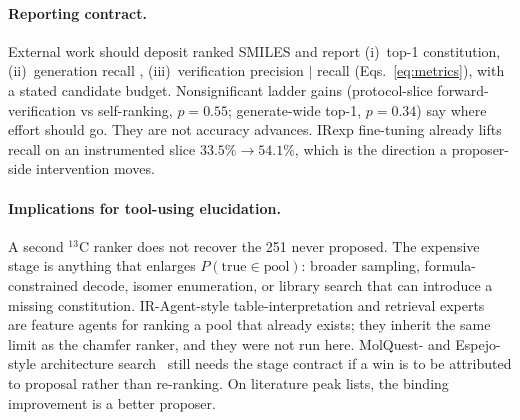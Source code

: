 \documentclass{article}
\begin{document}
\paragraph{Reporting contract.}
External work should deposit ranked SMILES and report (i)~top-1
constitution, (ii)~generation recall
, (iii)~verification precision $|$ recall
(Eqs.~\ref{eq:metrics}), with a stated candidate budget.
Nonsignificant ladder gains (protocol-slice forward-verification vs
self-ranking, $p{=}0.55$; generate-wide top-1, $p{=}0.34$) say where
effort should go.
They are not accuracy advances.
IRexp fine-tuning already lifts recall on an instrumented slice
$33.5\%\to54.1\%$, which is the direction a proposer-side intervention
moves.

\paragraph{Implications for tool-using elucidation.}
\label{sec:agentic}
A second $^{13}$C ranker does not recover the 251 never proposed.
The expensive stage is anything that enlarges
$P(\text{true}\in\text{pool})$: broader sampling, formula-constrained
decode, isomer enumeration, or library search that can introduce a
missing constitution.
IR-Agent-style table-interpretation and retrieval
experts~\citep{noh2025iragent} are feature agents for ranking a pool that
already exists; they inherit the same limit as the chamfer ranker, and
they were not run here.
MolQuest- and Espejo-style architecture
search~\citep{han2026molquest,espejo2026agentic} still needs the stage
contract if a win is to be attributed to proposal rather than re-ranking.
On literature peak lists, the binding improvement is a better proposer.
\end{document}
